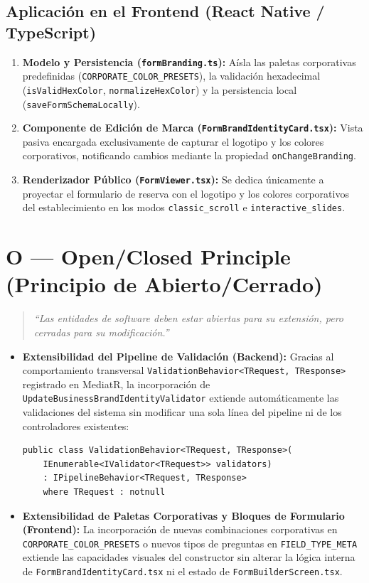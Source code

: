 \documentclass[11pt,a4paper]{article}
\begin{document}
\subsection{Aplicación en el Frontend (React Native / TypeScript)}
\begin{enumerate}[label=\textbf{\arabic*.}]
    \item \textbf{Modelo y Persistencia (\texttt{formBranding.ts}):} Aísla las paletas corporativas predefinidas (\texttt{CORPORATE\_COLOR\_PRESETS}), la validación hexadecimal (\texttt{isValidHexColor}, \texttt{normalizeHexColor}) y la persistencia local (\texttt{saveFormSchemaLocally}).
    \item \textbf{Componente de Edición de Marca (\texttt{FormBrandIdentityCard.tsx}):} Vista pasiva encargada exclusivamente de capturar el logotipo y los colores corporativos, notificando cambios mediante la propiedad \texttt{onChangeBranding}.
    \item \textbf{Renderizador Público (\texttt{FormViewer.tsx}):} Se dedica únicamente a proyectar el formulario de reserva con el logotipo y los colores corporativos del establecimiento en los modos \texttt{classic\_scroll} e \texttt{interactive\_slides}.
\end{enumerate}

\section{O --- Open/Closed Principle (Principio de Abierto/Cerrado)}

\begin{quote}
\textit{``Las entidades de software deben estar abiertas para su extensión, pero cerradas para su modificación.''}
\end{quote}

\begin{itemize}
    \item \textbf{Extensibilidad del Pipeline de Validación (Backend):} Gracias al comportamiento transversal \texttt{ValidationBehavior<TRequest, TResponse>} registrado en MediatR, la incorporación de \texttt{UpdateBusinessBrandIdentityValidator} extiende automáticamente las validaciones del sistema sin modificar una sola línea del pipeline ni de los controladores existentes:
\begin{lstlisting}[language={[Sharp]C}]
public class ValidationBehavior<TRequest, TResponse>(
    IEnumerable<IValidator<TRequest>> validators)
    : IPipelineBehavior<TRequest, TResponse>
    where TRequest : notnull
\end{lstlisting}
    \item \textbf{Extensibilidad de Paletas Corporativas y Bloques de Formulario (Frontend):} La incorporación de nuevas combinaciones corporativas en \texttt{CORPORATE\_COLOR\_PRESETS} o nuevos tipos de preguntas en \texttt{FIELD\_TYPE\_META} extiende las capacidades visuales del constructor sin alterar la lógica interna de \texttt{FormBrandIdentityCard.tsx} ni el estado de \texttt{FormBuilderScreen.tsx}.
\end{itemize}
\end{document}
